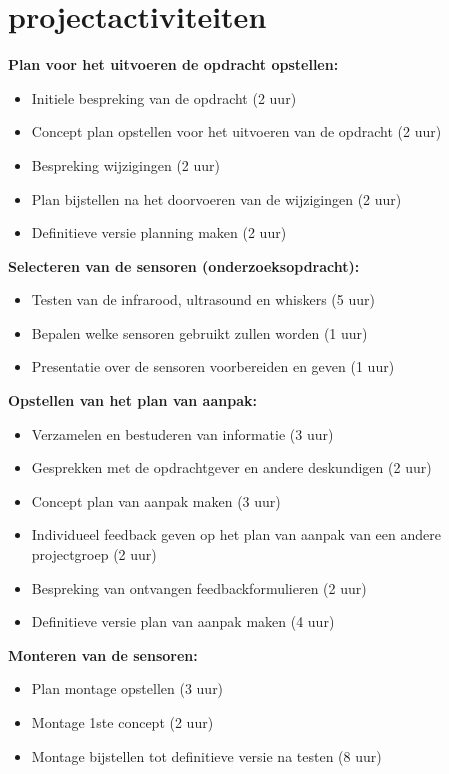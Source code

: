 \documentclass[oneside]{book}
\begin{document}
\chapter{projectactiviteiten}
{\large \textbf{ Plan voor het uitvoeren de opdracht opstellen:}}
\begin{itemize}
\item Initiele bespreking van de opdracht (2 uur)
\item Concept plan opstellen voor het uitvoeren van de opdracht (2 uur)
\item Bespreking wijzigingen (2 uur)
\item Plan bijstellen na het doorvoeren van de wijzigingen (2 uur)
\item Definitieve versie planning maken (2 uur)
\end{itemize}

{\large \textbf{Selecteren van de sensoren (onderzoeksopdracht):}}
\begin{itemize}
\item Testen van de infrarood, ultrasound en whiskers (5 uur)
\item Bepalen welke sensoren gebruikt zullen worden (1 uur)
\item Presentatie over de sensoren voorbereiden en geven (1 uur)
\end{itemize}

{\large \textbf{Opstellen van het plan van aanpak:}}
\begin{itemize}
\item Verzamelen en bestuderen van informatie (3 uur)
\item Gesprekken met de opdrachtgever en andere deskundigen (2 uur)
\item Concept plan van aanpak maken (3 uur)
\item Individueel feedback geven op het plan van aanpak van een andere projectgroep  (2 uur)
\item Bespreking van ontvangen feedbackformulieren (2 uur)
\item Definitieve versie plan van aanpak maken (4 uur)
\end{itemize}

{\large \textbf{Monteren van de sensoren:}}
\begin{itemize}
\item Plan montage opstellen (3 uur)
\item Montage 1ste concept (2 uur)
\item Montage bijstellen tot definitieve versie na testen (8 uur)
\end{itemize}
\end{document}
